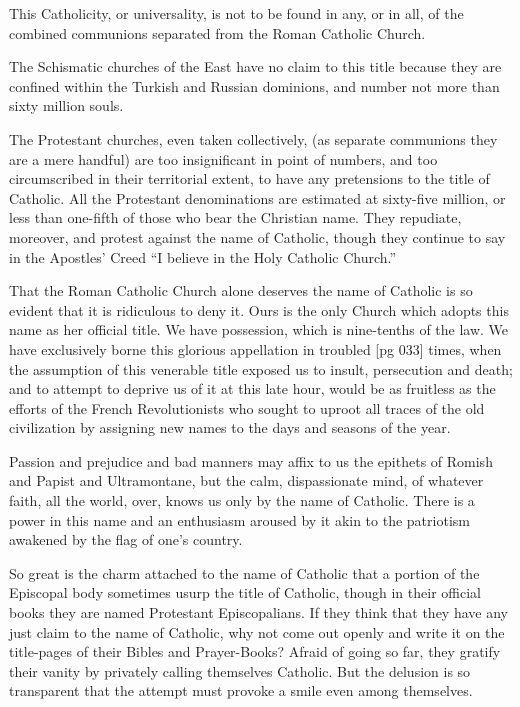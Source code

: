 This Catholicity, or universality, is not to be
found in any, or in all, of the combined communions
separated from the Roman Catholic Church.

The Schismatic churches of the East have no
claim to this title because they are confined within
the Turkish and Russian dominions, and number
not more than sixty million souls.

The Protestant churches, even taken collectively,
(as separate communions they are a mere handful)
are too insignificant in point of numbers, and
too circumscribed in their territorial extent, to
have any pretensions to the title of Catholic. All
the Protestant denominations are estimated at
sixty-five million, or less than one-fifth of those
who bear the Christian name. They repudiate,
moreover, and protest against the name of Catholic,
though they continue to say in the Apostles'
Creed “I believe in the Holy Catholic Church.”

That the Roman Catholic Church alone deserves
the name of Catholic is so evident that it is ridiculous
to deny it. Ours is the only Church which
adopts this name as her official title. We have possession,
which is nine-tenths of the law. We have
exclusively borne this glorious appellation in troubled
[pg 033]
times, when the assumption of this venerable
title exposed us to insult, persecution and death;
and to attempt to deprive us of it at this late hour,
would be as fruitless as the efforts of the French
Revolutionists who sought to uproot all traces of
the old civilization by assigning new names to the
days and seasons of the year.

Passion and prejudice and bad manners may
affix to us the epithets of Romish and
Papist and Ultramontane, but the calm,
dispassionate mind, of whatever faith, all the world, over, knows us
only by the name of Catholic. There is a power in
this name and an enthusiasm aroused by it akin
to the patriotism awakened by the flag of one's
country.

So great is the charm attached to the name of
Catholic that a portion of the Episcopal body
sometimes usurp the title of Catholic, though in
their official books they are named Protestant
Episcopalians. If they think that they have any
just claim to the name of Catholic, why not come
out openly and write it on the title-pages of their
Bibles and Prayer-Books? Afraid of going so far,
they gratify their vanity by privately calling
themselves Catholic. But the delusion is so transparent
that the attempt must provoke a smile even
among themselves.

